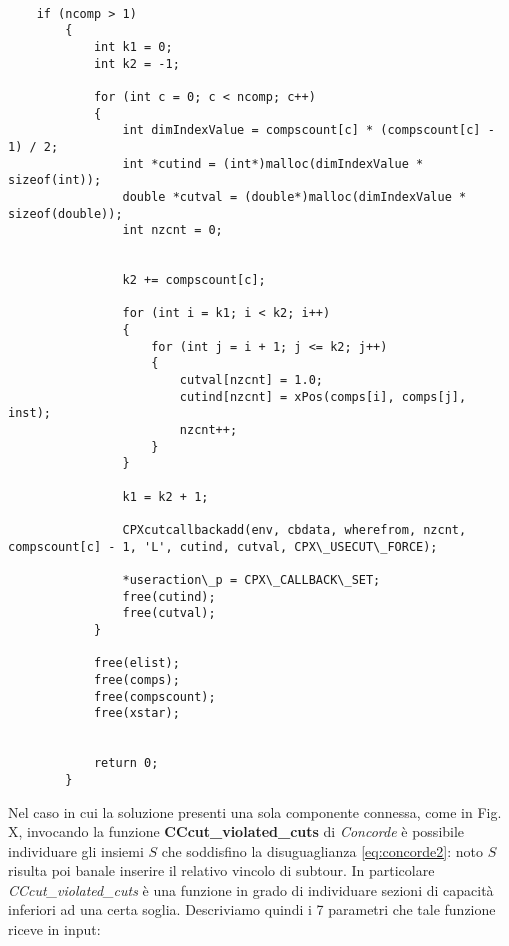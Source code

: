\documentclass[11pt]{article}
\begin{document}
\begin{lstlisting}

    if (ncomp > 1)
        {
            int k1 = 0;
            int k2 = -1;

            for (int c = 0; c < ncomp; c++)
            {
                int dimIndexValue = compscount[c] * (compscount[c] - 1) / 2; 
                int *cutind = (int*)malloc(dimIndexValue * sizeof(int));
                double *cutval = (double*)malloc(dimIndexValue * sizeof(double));
                int nzcnt = 0;

                
                k2 += compscount[c];

                for (int i = k1; i < k2; i++)
                {
                    for (int j = i + 1; j <= k2; j++)
                    {
                        cutval[nzcnt] = 1.0;
                        cutind[nzcnt] = xPos(comps[i], comps[j], inst);
                        nzcnt++;
                    }
                }

                k1 = k2 + 1;
                
                CPXcutcallbackadd(env, cbdata, wherefrom, nzcnt, compscount[c] - 1, 'L', cutind, cutval, CPX\_USECUT\_FORCE);

                *useraction\_p = CPX\_CALLBACK\_SET; 
                free(cutind);
                free(cutval);
            }

            free(elist);
            free(comps);
            free(compscount);
            free(xstar);


            return 0;
        }

\end{lstlisting}

Nel caso in cui la soluzione presenti una sola componente connessa, come in Fig. X, invocando la funzione \textbf{CCcut\_violated\_cuts} di \textit{Concorde} è possibile individuare gli insiemi $S$ che soddisfino la disuguaglianza \eqref{eq:concorde2}: noto $S$ risulta poi banale inserire il relativo vincolo di subtour. In particolare \textit{CCcut\_violated\_cuts} è una funzione in grado di individuare sezioni di capacità inferiori ad una certa soglia. Descriviamo quindi i 7 parametri che tale funzione riceve in input:
\end{document}
